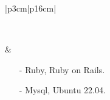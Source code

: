 \documentclass[letterpaper, 11pt]{article}
\begin{document}
\begin{tabular}{|p{3cm}|p{16cm}|}
\begin{minipage}[t]{\linewidth}
\begin{itemize}[leftmargin=*]
    \end{itemize}
  \end{minipage}                  \\
  \hline
  \hspace{5pt} %
  \vspace{2pt}

   &
  \begin{minipage}[t]{\linewidth}
    \begin{itemize}[leftmargin=*]
      \item[-]{Ruby, Ruby on Rails.}
      \item[-]{Mysql, Ubuntu 22.04.}
    \end{itemize}
  \end{minipage}                  \\
  \hline
\end{tabular}
\end{document}
